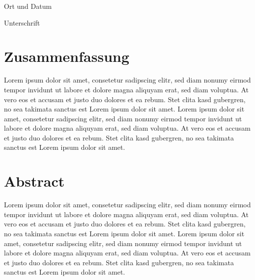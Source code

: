 \vspace{2cm}
\noindent\begin{minipage}{.4\linewidth}
\centering
\hrulefill\par 
Ort und Datum
\end{minipage}\hfill
\begin{minipage}{.4\linewidth}
\centering
\hrulefill\par 
Unterschrift
\end{minipage}
\cleardoublepage

\chapter*{Zusammenfassung}

Lorem ipsum dolor sit amet, consetetur sadipscing elitr, sed diam nonumy eirmod tempor invidunt ut labore et dolore magna aliquyam erat, sed diam voluptua. At vero eos et accusam et justo duo dolores et ea rebum. Stet clita kasd gubergren, no sea takimata sanctus est Lorem ipsum dolor sit amet. Lorem ipsum dolor sit amet, consetetur sadipscing elitr, sed diam nonumy eirmod tempor invidunt ut labore et dolore magna aliquyam erat, sed diam voluptua. At vero eos et accusam et justo duo dolores et ea rebum. Stet clita kasd gubergren, no sea takimata sanctus est Lorem ipsum dolor sit amet.

\chapter*{Abstract}

Lorem ipsum dolor sit amet, consetetur sadipscing elitr, sed diam nonumy eirmod tempor invidunt ut labore et dolore magna aliquyam erat, sed diam voluptua. At vero eos et accusam et justo duo dolores et ea rebum. Stet clita kasd gubergren, no sea takimata sanctus est Lorem ipsum dolor sit amet. Lorem ipsum dolor sit amet, consetetur sadipscing elitr, sed diam nonumy eirmod tempor invidunt ut labore et dolore magna aliquyam erat, sed diam voluptua. At vero eos et accusam et justo duo dolores et ea rebum. Stet clita kasd gubergren, no sea takimata sanctus est Lorem ipsum dolor sit amet.

\pagestyle{running}
\renewcommand{\contentsname}{Table of Contents}
\tableofcontents

\listoffigures
